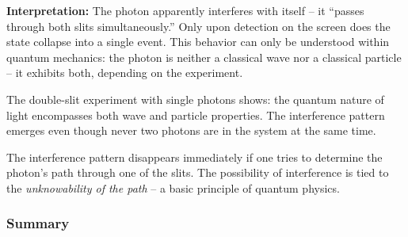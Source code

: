 \textbf{Interpretation:}  
The photon apparently interferes with itself – it “passes through both slits simultaneously.” Only upon detection on the screen does the state collapse into a single event. This behavior can only be understood within quantum mechanics: the photon is neither a classical wave nor a classical particle – it exhibits both, depending on the experiment.

\vspace{1em}
\begin{tcolorbox}[hypobox, title=Key Idea]
	\label{box:schlüsselidee}
	\small
	The double-slit experiment with single photons shows: the quantum nature of light encompasses both wave and particle properties. The interference pattern emerges even though never two photons are in the system at the same time.
\end{tcolorbox}
\vspace{1em}
\begin{tcolorbox}[didaktikbox, title=Wave as well as Particle Properties]
	\label{box:wellen}
	\small
	The interference pattern disappears immediately if one tries to determine the photon’s path through one of the slits. The possibility of interference is tied to the \emph{unknowability of the path} – a basic principle of quantum physics.
\end{tcolorbox}

\subsubsection*{Summary}


